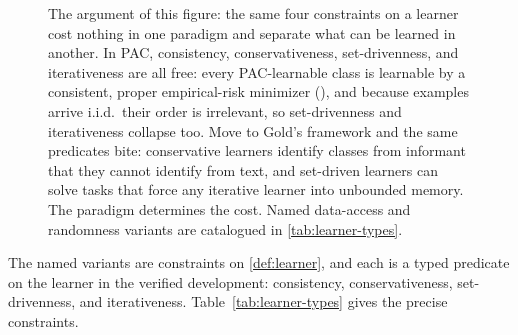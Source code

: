 \begin{figure}[ht]
\caption[Lattice of learner constraints: free in PAC, biting in Gold]{The argument of this figure:
the same four constraints on a learner cost nothing in one paradigm and separate what can be learned in
another. In PAC, consistency, conservativeness, set-drivenness, and iterativeness are all free: every
PAC-learnable class is learnable by a consistent, proper empirical-risk minimizer
(), and because examples arrive i.i.d.\ their order is irrelevant,
so set-drivenness and iterativeness collapse too. Move to Gold's framework and the same predicates bite:
conservative learners identify classes from informant that they cannot identify from text, and
set-driven learners can solve tasks that force any iterative learner into unbounded memory. The paradigm determines the cost. Named data-access and randomness variants are catalogued in
\cref{tab:learner-types}.}
\label{fig:learner-taxonomy}
\end{figure}

The named variants are constraints on \cref{def:learner}, and each is a typed predicate on the learner in the verified development: consistency, conservativeness, set-drivenness, and iterativeness. Table~\ref{tab:learner-types} gives the precise constraints.

